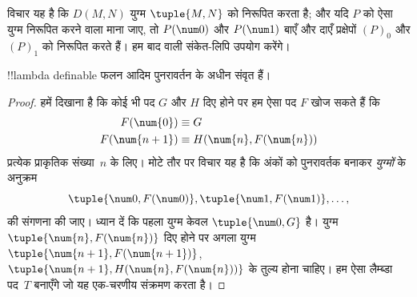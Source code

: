 \documentclass[../../../include/open-logic-section]{subfiles}
\begin{document}
विचार यह है कि $D(M,N)$ युग्म $\tuple{M, N}$ को निरूपित करता है; और यदि
$P$ को ऐसा युग्म निरूपित करने वाला माना जाए, तो $P(\num 0)$ और $P(\num 1)$
बाएँ और दाएँ प्रक्षेपों $(P)_0$ और $(P)_1$ को निरूपित करते हैं। हम बाद वाली
संकेत-लिपि उपयोग करेंगे।

\begin{lem}
!!{lambda definable} फलन आदिम पुनरावर्तन के अधीन संवृत हैं।
\end{lem}

\begin{proof}
हमें दिखाना है कि कोई भी पद $G$ और $H$ दिए होने पर हम ऐसा पद $F$ खोज सकते
हैं कि
\begin{align*}
F(\num{0}) & \equiv G \\
F(\num{n+1}) & \equiv H(\num{n}, F(\num{n}))
\end{align*}
प्रत्येक प्राकृतिक संख्या~$n$ के लिए। मोटे तौर पर विचार यह है कि अंकों को
पुनरावर्तक बनाकर \emph{युग्मों} के अनुक्रम
\[
\tuple{\num 0, F(\num 0)}, \tuple{\num 1, F(\num 1)}, \dots,
\]
की संगणना की जाए। ध्यान दें कि पहला युग्म केवल $\tuple{\num 0, G}$ है।
युग्म $\tuple{\num{n}, F(\num{n})}$ दिए होने पर अगला युग्म
$\tuple{\num{n+1}, F(\num{n+1})}$, ~$\tuple{\num{n+1}, H(\num{n},
F(\num{n}))}$ के तुल्य होना चाहिए। हम ऐसा लैम्ब्डा पद~$T$ बनाएँगे जो यह
एक-चरणीय संक्रमण करता है।


\end{proof}
\end{document}
